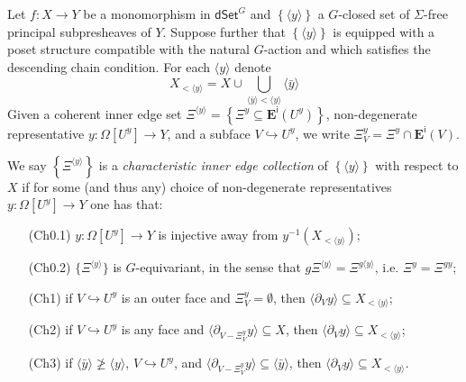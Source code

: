\documentclass[a4paper,10pt
,draft
]{article}%
\renewcommand{\1}{\eta}%
\begin{document}
\begin{definition}\label{CHAREDGE DEF}
Let $f\colon X \to Y$ be a monomorphism in 
$\mathsf{dSet}^G$ and 
$\left\{ \langle y \rangle\right\}$
a $G$-closed set of $\Sigma$-free principal subpresheaves of $Y$. 
Suppose further that 
$\left\{ \langle y \rangle \right\}$ is equipped 
with a poset structure compatible with the natural $G$-action
and which satisfies the descending chain condition.
For each $\langle y \rangle$ denote
\[
X_{< \langle y \rangle} = X \cup 
\bigcup_{\langle\bar{y}\rangle < \langle y \rangle} \langle \bar{y} \rangle
\]
Given a coherent inner edge set 
$
\Xi^{\langle y \rangle} =
\left\{ \Xi^y \subseteq \boldsymbol{E}^{\mathsf{i}}(U^y)\right\}$,
non-degenerate representative
$y \colon \Omega[U^y] \to Y$, and a subface $V \hookrightarrow U^y$,
we write
$\Xi^y_V = \Xi^y \cap \boldsymbol{E}^{\mathsf{i}}(V)$.

We say
$
\left\{ \Xi^{\langle y \rangle} \right \} 
$
is a \emph{characteristic inner edge collection} 
of $\left\{ \langle y \rangle \right\}$ with respect to $X$ if
for some (and thus any) choice of non-degenerate representatives
$y\colon \Omega[U^y] \to Y$ one has that:
\begin{enumerate}
\item[(Ch0.1)] $y \colon \Omega[U^y] \to Y$ is injective away from
$y^{-1}\left( X_{< \langle y \rangle} \right)$; 
\item[(Ch0.2)]
$\{\Xi^{\langle y \rangle}\}$ is $G$-equivariant, in the sense that
$g \Xi^{\langle y \rangle} =
\Xi^{g \langle y \rangle}$,
i.e. $\Xi^y = \Xi^{gy}$;
\item[(Ch1)] if $V \hookrightarrow U^y$ is an outer face and $\Xi^y_V = \emptyset$,
then $\langle \partial_V y \rangle \subseteq X_{< \langle y \rangle}$;
\item[(Ch2)] if $V \hookrightarrow U^y$ is any face and
$\langle \partial_{V-\Xi^y_V} y\rangle \subseteq X$,
then
$\langle \partial_V y\rangle \subseteq X_{< \langle y \rangle}$;
\item[(Ch3)] if $\langle \bar{y} \rangle \not \geq \langle y \rangle$,
$V \hookrightarrow U^y$,
and
$\langle \partial_{V-\Xi^y_V} y\rangle \subseteq \langle \bar{y} \rangle$,
then
$\langle \partial_V y\rangle \subseteq X_{< \langle y \rangle}$.
\end{enumerate}
\end{definition}
\end{document}
